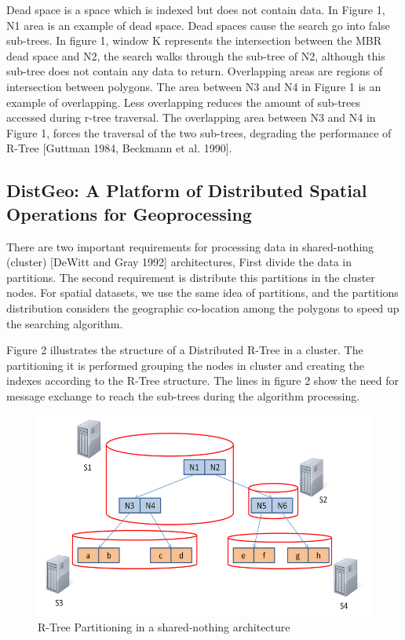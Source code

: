 	Dead space is a space which is indexed but does not contain data. In Figure 1, N1 area is an example of dead space. Dead spaces cause the search go into false sub-trees. In figure 1, window K represents the intersection between the MBR dead space and N2, the search walks through the sub-tree of N2, although this sub-tree does not contain any data to return.
Overlapping areas are regions of intersection between polygons. The area between N3 and N4 in Figure 1 is an example of overlapping. Less overlapping reduces the amount of sub-trees accessed during r-tree traversal. The overlapping area between N3 and N4 in Figure 1, forces the traversal of the two sub-trees, degrading the performance of R-Tree [Guttman 1984, Beckmann et al. 1990].

\subsection{DistGeo: A Platform of Distributed Spatial Operations for Geoprocessing}

There are two important requirements for processing data in shared-nothing (cluster) [DeWitt and Gray 1992] architectures, First divide the data in partitions. The second requirement is distribute this partitions in the cluster nodes. For spatial datasets, we use the same idea of partitions, and the partitions distribution considers the geographic co-location among the polygons to speed up the searching algorithm.

Figure 2 illustrates the structure of a Distributed R-Tree in a cluster. The partitioning it is performed grouping the nodes in cluster and creating the indexes according to the R-Tree structure. The lines in figure 2 show the need for message exchange to reach the sub-trees during the algorithm processing.

\begin{figure}[ht]
\centering
\includegraphics[width=.5\textwidth]{r-tree-partiotioning.png}
\caption{R-Tree Partitioning in a shared-nothing architecture}
\label{fig: R-Tree Partitioning in a shared-nothing architecture}
\end{figure}

